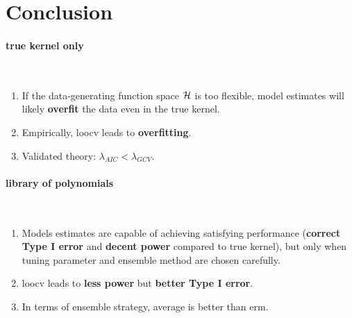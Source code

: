 \documentclass[11pt]{article}
\begin{document}
\newpage
\section{{\bf Conclusion}}
\paragraph{true kernel only}\mbox{}\\
\begin{enumerate}[1)]
\item If the data-generating function space ${\cal H}$ is too flexible, model estimates will likely \textbf{overfit} the data even in the true kernel.
\item Empirically, loocv leads to \textbf{overfitting}.
\item Validated theory: $\lambda_{AIC}<\lambda_{GCV}$. 
\end{enumerate}

\paragraph{library of polynomials}\mbox{}\\
\begin{enumerate}[1)]
\item Models estimates are capable of achieving satisfying performance (\textbf{correct Type I error} and \textbf{decent power} compared to true kernel), but only when tuning parameter and ensemble method are chosen carefully.
\item loocv leads to \textbf{less power} but \textbf{better Type I error}.
\item In terms of ensemble strategy, average is better than erm.
\end{enumerate}



\clearpage



\end{document}
